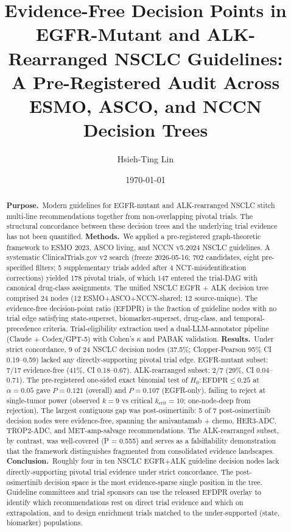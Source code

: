 \documentclass[11pt,a4paper]{article}
\title{\fontsize{15}{18}\bfseries\sffamily
Evidence-Free Decision Points in EGFR-Mutant and ALK-Rearranged NSCLC Guidelines:\\
A Pre-Registered Audit Across ESMO, ASCO, and NCCN Decision Trees}
\author[1,*]{Hsieh-Ting Lin}
\affil[1]{Department of Hematology \& Medical Oncology, Koo Foundation Sun Yat-Sen Cancer Center, 125 Lide Rd., Beitou Dist., Taipei 11259, Taiwan. ORCID iD: 0009-0002-3974-4528.}
\affil[*]{Correspondence: \texttt{htlin222@kfsyscc.org}.}
\date{\today}
\begin{document}
\maketitle
\thispagestyle{empty}
\vspace{-1.5em}

\begin{abstract}
\noindent
\textbf{Purpose.}\, Modern guidelines for EGFR-mutant and ALK-rearranged NSCLC stitch multi-line recommendations together from non-overlapping pivotal trials. The structural concordance between these decision trees and the underlying trial evidence has not been quantified.
\textbf{Methods.}\, We applied a pre-registered graph-theoretic framework to ESMO 2023, ASCO living, and NCCN v5.2024 NSCLC guidelines. A systematic ClinicalTrials.gov v2 search (freeze 2026-05-16; 702 candidates, eight pre-specified filters; 5 supplementary trials added after 4 NCT-misidentification corrections) yielded 178 pivotal trials, of which 147 entered the trial-DAG with canonical drug-class assignments. The unified NSCLC EGFR + ALK decision tree comprised 24 nodes (12 ESMO+ASCO+NCCN-shared; 12 source-unique). The evidence-free decision-point ratio (EFDPR) is the fraction of guideline nodes with no trial edge satisfying state-superset, biomarker-superset, drug-class, and temporal-precedence criteria. Trial-eligibility extraction used a dual-LLM-annotator pipeline (Claude + Codex/GPT-5) with Cohen's $\kappa$ and PABAK validation.
\textbf{Results.}\, Under strict concordance, 9 of 24 NSCLC decision nodes (37.5\%; Clopper-Pearson 95\% CI 0.19--0.59) lacked any directly-supporting pivotal trial edge. EGFR-mutant subset: 7/17 evidence-free (41\%, CI 0.18--0.67). ALK-rearranged subset: 2/7 (29\%, CI 0.04--0.71). The pre-registered one-sided exact binomial test of $H_0: \mathrm{EFDPR} \le 0.25$ at $\alpha = 0.05$ gave $P = 0.121$ (overall) and $P = 0.107$ (EGFR-only), failing to reject at single-tumor power (observed $k = 9$ vs critical $k_{\mathrm{crit}} = 10$; one-node-deep from rejection). The largest contiguous gap was post-osimertinib: 5 of 7 post-osimertinib decision nodes were evidence-free, spanning the amivantamab + chemo, HER3-ADC, TROP2-ADC, and MET-amp-salvage recommendations. The ALK-rearranged subset, by contrast, was well-covered (P = 0.555) and serves as a falsifiability demonstration that the framework distinguishes fragmented from consolidated evidence landscapes.
\textbf{Conclusion.}\, Roughly four in ten NSCLC EGFR+ALK guideline decision nodes lack directly-supporting pivotal trial evidence under strict concordance. The post-osimertinib decision space is the most evidence-sparse single position in the tree. Guideline committees and trial sponsors can use the released EFDPR overlay to identify which recommendations rest on direct trial evidence and which on extrapolation, and to design enrichment trials matched to the under-supported (state, biomarker) populations.
\end{abstract}
\end{document}
